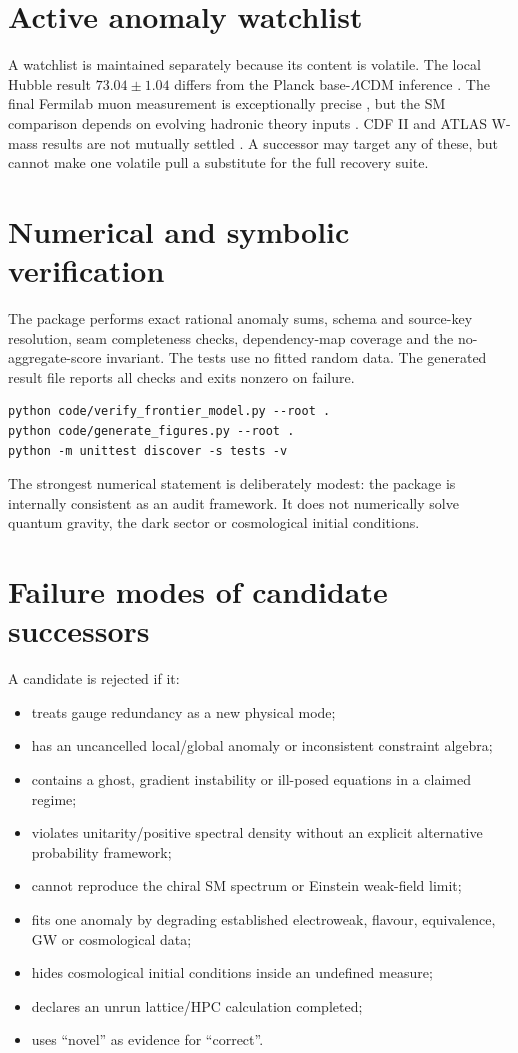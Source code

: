 \documentclass[11pt,a4paper]{article}
\begin{document}
\section{Active anomaly watchlist}
A watchlist is maintained separately because its content is volatile.  The local Hubble result $73.04\pm1.04$ differs from the Planck base-$\Lambda$CDM inference \cite{Riess2022,Planck2018}.  The final Fermilab muon measurement is exceptionally precise \cite{MuonG2Final2026}, but the SM comparison depends on evolving hadronic theory inputs \cite{MuonG2Theory2025}.  CDF II and ATLAS W-mass results are not mutually settled \cite{CDFW2022,ATLASW2024}.  A successor may target any of these, but cannot make one volatile pull a substitute for the full recovery suite.

\section{Numerical and symbolic verification}
The package performs exact rational anomaly sums, schema and source-key resolution, seam completeness checks, dependency-map coverage and the no-aggregate-score invariant.  The tests use no fitted random data.  The generated result file reports all checks and exits nonzero on failure.

\begin{verbatim}
python code/verify_frontier_model.py --root .
python code/generate_figures.py --root .
python -m unittest discover -s tests -v
\end{verbatim}

The strongest numerical statement is deliberately modest: the package is internally consistent as an audit framework.  It does not numerically solve quantum gravity, the dark sector or cosmological initial conditions.

\section{Failure modes of candidate successors}
A candidate is rejected if it:
\begin{itemize}
\item treats gauge redundancy as a new physical mode;
\item has an uncancelled local/global anomaly or inconsistent constraint algebra;
\item contains a ghost, gradient instability or ill-posed equations in a claimed regime;
\item violates unitarity/positive spectral density without an explicit alternative probability framework;
\item cannot reproduce the chiral SM spectrum or Einstein weak-field limit;
\item fits one anomaly by degrading established electroweak, flavour, equivalence, GW or cosmological data;
\item hides cosmological initial conditions inside an undefined measure;
\item declares an unrun lattice/HPC calculation completed;
\item uses ``novel'' as evidence for ``correct''.
\end{itemize}
\end{document}
